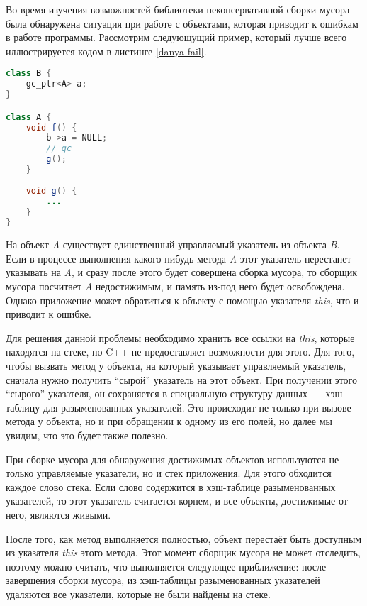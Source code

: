 Во время изучения возможностей библиотеки неконсервативной сборки мусора была обнаружена ситуация при работе с объектами, которая приводит к ошибкам в работе программы. Рассмотрим следующущий пример, который лучше всего иллюстрируется кодом в листинге \ref{danya-fail}.

\begin{lstlisting}[caption = Пример ошибки\label{danya-fail},language=Java]
class B {
    gc_ptr<A> a;
}

class A {
    void f() {
        b->a = NULL;
        // gc
        g();
    }
    
    void g() {
        ...
    }
}
\end{lstlisting}


На объект \textit{A} существует единственный управляемый указатель из объекта \textit{B}. Если в процессе выполнения какого-нибудь метода \textit{A} этот указатель перестанет указывать на \textit{A}, и сразу после этого будет совершена
сборка мусора, то сборщик мусора посчитает \textit{A} недостижимым, и память из-под него
будет освобождена. Однако приложение может обратиться к объекту с помощью
указателя \textit{this}, что и приводит к ошибке.

Для решения данной проблемы необходимо хранить все ссылки на \textit{this},
которые находятся на стеке, но C++ не предоставляет возможности для этого. 
Для того, чтобы вызвать метод у объекта, на который
указывает управляемый указатель, сначала нужно получить ``сырой'' указатель на этот
объект. При получении этого ``сырого'' указателя, он сохраняется в специальную структуру данных~--- хэш-таблицу для разыменованных указателей.
Это происходит не только при вызове метода у объекта, но и при обращении к одному из
его полей, но далее мы увидим, что это будет также полезно.

При сборке мусора для обнаружения достижимых объектов используются не только 
управляемые указатели, но и стек приложения. Для этого обходится каждое слово стека.
Если слово содержится в хэш-таблице разыменованных указателей, то этот указатель считается корнем, и все объекты, достижимые от него, являются живыми.

После того, как метод выполняется полностью, объект перестаёт быть доступным из
указателя \textit{this} этого метода. Этот момент сборщик мусора не может отследить,
поэтому можно считать, что выполняется следующее приближение: после завершения сборки мусора, из
хэш-таблицы разыменованных указателей удаляются все указатели, которые не были найдены на стеке.

